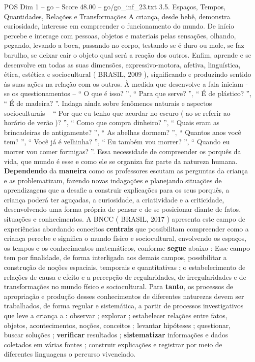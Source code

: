 \begin{textsample}{POS Dim 1 – go – Score 48.00 – go/go\_inf\_23.txt}  \label{ex:f1_pos_099}
3.5.
Espaços, Tempos, Quantidades, Relações e Transformações A criança, desde bebê, demonstra curiosidade, interesse em compreender o funcionamento do mundo.
De início percebe e interage com pessoas, objetos e materiais pelas sensações, olhando, pegando, levando a boca, passando no corpo, testando se é duro ou mole, se faz barulho, se deixar cair o objeto qual será a reação dos outros.
Enfim, aprende e se desenvolve em todas as suas dimensões, expressivo-motora, afetiva, linguística, ética, estética e sociocultural ( BRASIL, 2009 ), significando e produzindo sentido às suas ações na relação com os outros.
À medida que desenvolve a fala iniciam -se os questionamentos – “ O que é isso? ”, “ Para que serve? ”, “ É de plástico? ”, “ É de madeira? ”.
Indaga ainda sobre fenômenos naturais e aspectos socioculturais – “ Por que eu tenho que acordar no escuro ( ao se referir ao horário de verão )? ”, “ Como que compra dinheiro? ”, “ Quais eram as brincadeiras de antigamente? ”, “ As abelhas dormem? ”, “ Quantos anos você tem? ”, “ Você já é velhinha? ”, “ Eu também vou morrer? ”, “ Quando eu morrer vou comer formigas? ”.
Essa necessidade de compreender os porquês da vida, que mundo é esse e como ele se organiza faz parte da natureza humana. \textbf{Dependendo} da \textbf{maneira} como os professores escutam as perguntas da criança e as problematizam, fazendo novas indagações e planejando situações de aprendizagens que a desafie a construir explicações para os seus porquês, a criança poderá ter aguçadas, a curiosidade, a criatividade e a criticidade, desenvolvendo uma forma própria de pensar e de se posicionar diante de fatos, situações e conhecimentos.
A BNCC ( BRASIL, 2017 ) apresenta este campo de experiências abordando conceitos \textbf{centrais} que possibilitam compreender como a criança percebe e significa o mundo físico e sociocultural, envolvendo os espaços, os tempos e os conhecimentos matemáticos, conforme \textbf{segue} abaixo : Esse campo tem por finalidade, de forma interligada aos demais campos, possibilitar a construção de noções espaciais, temporais e quantitativas ; o estabelecimento de relações de causa e efeito e a percepção de regularidades, de irregularidades e de transformações no mundo físico e sociocultural.
Para \textbf{tanto}, os processos de apropriação e produção desses conhecimentos de diferentes naturezas devem ser trabalhados, de forma regular e sistemática, a partir de processos investigativos que leve a criança a : observar ; explorar ; estabelecer relações entre fatos, objetos, acontecimentos, noções, conceitos ; levantar hipóteses ; questionar, buscar soluções ; \textbf{verificar} resultados ; \textbf{sistematizar} informações e dados coletados em várias fontes ; construir explicações e registrar por meio de diferentes linguagens o percurso vivenciado.

\end{textsample}
